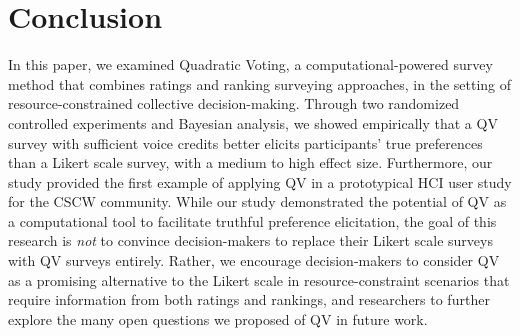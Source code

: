 

\section{Conclusion} \label{conclusion}
In this paper, we examined Quadratic Voting, a computational-powered survey method that combines ratings and ranking surveying approaches, in the setting of resource-constrained collective decision-making. Through two randomized controlled experiments and Bayesian analysis, we showed empirically that a QV survey with sufficient voice credits better elicits participants' true preferences than a Likert scale survey, with a medium to high effect size. Furthermore, our study provided the first example of applying QV in a prototypical HCI user study for the CSCW community. While our study demonstrated the potential of QV as a computational tool to facilitate truthful preference elicitation, the goal of this research is \textit{not} to convince decision-makers to replace their Likert scale surveys with QV surveys entirely. Rather, we encourage decision-makers to consider QV as a promising alternative to the Likert scale in resource-constraint scenarios that require information from both ratings and rankings, and researchers to further explore the many open questions we proposed of QV in future work.




